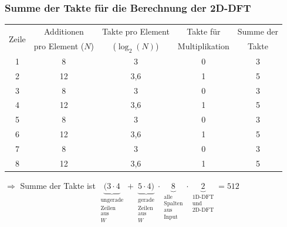 \begin{frame}\frametitle{Summe der Takte für die Berechnung der 2D-DFT}
\begin{table}[ht!]
\centering
\begin{tabular}{ccccc}
\hline
\multirow{2}{*}{Zeile} & Additionen & Takte pro Element & Takte für & Summe der\\
     & pro Element ($N$) & ($\log_2(N)$) & Multiplikation & Takte\\
\hline
1& 8  & 3   &0 &3\\
2& 12 & 3,6 &1 &5\\
3& 8  & 3   &0 &3\\
4& 12 & 3,6 &1 &5\\
5& 8  & 3   &0 &3\\
6& 12 & 3,6 &1 &5\\
7& 8  & 3   &0 &3\\
8& 12 & 3,6 &1 &5\\
\hline
\end{tabular}
\end{table}
\medskip
\begin{center}
$\Rightarrow$ Summe der Takte ist $\underbrace{(3 \cdot 4}_{\substack{\textrm{ungerade}\\\textrm{Zeilen}\\\textrm{aus}\\W}}  + \underbrace{5 \cdot 4)}_{\substack{\textrm{gerade}\\\textrm{Zeilen}\\\textrm{aus}\\W}} \cdot \underbrace{8}_{\substack{\textrm{alle}\\\textrm{Spalten}\\\textrm{aus}\\\textrm{Input}}} \cdot \underbrace{2}_{\substack{\textrm{1D-DFT}\\\textrm{und}\\\textrm{2D-DFT}}} = 512$ 
\end{center}
\end{frame}


